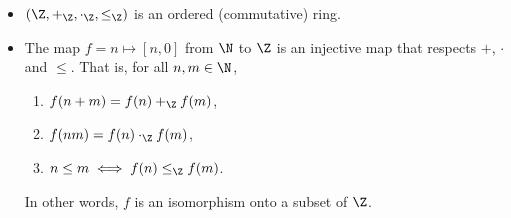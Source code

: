 \begin{theorem*} \leavevmode
    \begin{itemize}
        \item $(\Z, +_\Z, \cdot_\Z, \le_\Z)$ is an ordered (commutative) ring.
        \item The map $f = n \mapsto [n, 0]$ from $\N$ to $\Z$ is an
        injective map that respects $+$, $\cdot$ and $\le$.
        That is, for all $n, m \in \N$,
        \begin{enumerate}
            \item $f(n + m) = f(n) +_\Z f(m)$,
            \item $f(nm) = f(n) \cdot_\Z f(m)$,
            \item $n \le m \iff f(n) \le_\Z f(m)$.
        \end{enumerate}
        In other words, $f$ is an isomorphism onto a subset of $\Z$.
    \end{itemize}
\end{theorem*}

